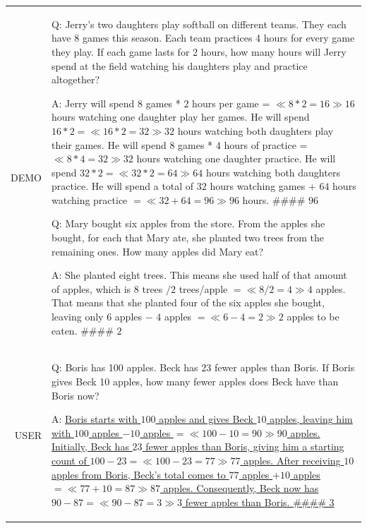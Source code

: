 \vspace{0.5em}
\begin{tcolorbox}

\begingroup
\setlength{\leftskip}{0em}
\setlength{\rightskip}{2em}

\begin{tabular}{r l l}
{\color{gray} \footnotesize{DEMO}} &
\multicolumn{2}{p{0.8\textwidth}}{
Q: Jerry's two daughters play softball on different teams. They each have 8 games this season. Each team practices 4 hours for every game they play. If each game lasts for 2 hours, how many hours will Jerry spend at the field watching his daughters play and practice altogether?

\vspace{0.3em}

A: Jerry will spend $8$ games * $2$ hours per game = $\ll 8*2=16 \gg 16$ hours watching one daughter play her games. He will spend $16 * 2 = \ll 16*2=32 \gg 32$ hours watching both daughters play their games. He will spend $8$ games * $4$ hours of practice = $\ll 8*4=32 \gg 32$ hours watching one daughter practice. He will spend $32 * 2 = \ll 32*2=64 \gg 64$ hours watching both daughters practice. He will spend a total of $32$ hours watching games + $64$ hours watching practice $= \ll 32+64=96 \gg 96$ hours. \#\#\#\# $96$

\vspace{0.7em}

Q: Mary bought six apples from the store. From the apples she bought, for each that Mary ate, she planted two trees from the remaining ones. How many apples did Mary eat?

\vspace{0.3em}

A: She planted eight trees. This means she used half of that amount of apples, which is $8$ trees $/ 2$ trees/apple $= \ll 8/2=4 \gg 4$ apples. That means that she planted four of the six apples she bought, leaving only $6$ apples $-$ $4$ apples $= \ll 6-4=2 \gg 2$ apples to be eaten. \#\#\#\# $2$

\vspace{0.7em}
} \\
{\color{gray} \footnotesize{USER}} &
\multicolumn{2}{p{0.8\textwidth}}{
Q: Boris has 100 apples. Beck has 23 fewer apples than Boris. If Boris gives Beck 10 apples, how many fewer apples does Beck have than Boris now?
\vspace{0.3em}

A: \uline{Boris starts with $100$ apples and gives Beck $10$ apples, leaving him with $100$ apples $- 10$ apples $= \ll 100-10=90 \gg 90$ apples. Initially, Beck has $23$ fewer apples than Boris, giving him a starting count of $100 - 23 = \ll 100-23=77 \gg 77$ apples. After receiving $10$ apples from Boris, Beck's total comes to $77$ apples $+ 10$ apples $= \ll 77+10=87 \gg 87$ apples. Consequently, Beck now has $90 - 87 = \ll 90-87=3 \gg 3$ fewer apples than Boris. \#\#\#\# 3}
}
\end{tabular}

\endgroup

\end{tcolorbox}
\vspace{0.5em}

